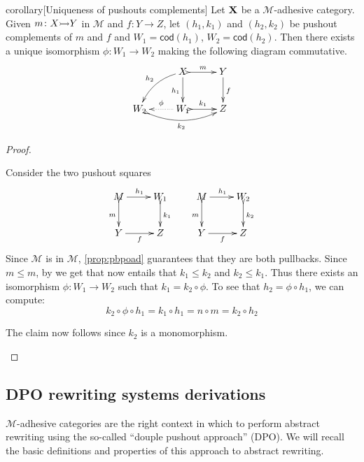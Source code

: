 \documentclass[a4paper,UKenglish,cleveref,pdftex, thm-restate,numberwithinsect]{lipics}
\newcommand{\cod}[1]{\mathsf{cod}({#1})}
\newcommand{\mto}[0]{\scalebox{1}{$\rightarrowtail$}}
\def\X{\textbf {\textup{X}}}
\def\Y{\textbf {\textup{Y}}}
\begin{document}
\begin{theoremEnd}[category=sec2]{corollary}[Uniqueness of pushouts complements]\label{lem:pocomp} 
Let $\X$ be a $\mathcal{M}$-adhesive category. Given $m\colon X\mto Y$ in $\mathcal{M}$ and $f\colon Y\to Z$, let $(h_1, k_1)$ and $(h_2, k_2)$ be pushout complements of $m$  and $f$ and $W_1=\cod{h_1}$, $W_2=\cod{h_2}$. Then there exists a unique isomorphism $\phi\colon W_1\to W_2$ making the following diagram commutative.
\[\xymatrix{&X \ar@{>->}[r]^{m} \ar[d]_{h_1} \ar@/_.3cm/[dl]_{h_2}& Y \ar[d]^{f} \\ W_2 \ar@{>->}@/_.4cm/[rr]_{k_2} &W_1 \ar@{.>}[l]_{\phi} \ar@{>->}[r]^{k_1} & Z }\]
\end{theoremEnd}
\begin{proof}\begin{proofEnd}
	Consider the two pushout squares
	\[\xymatrix{M \ar[r]^{h_1}\ar@{>->}[d]_{m}& W_1 \ar@{>->}[d]^{k_1} & M \ar@{>->}[d]_{m} \ar[r]^{h_1}& W_2 \ar@{>->}[d]^{k_2}\\Y\ar[r]_{f}&Z &Y \ar[r]_{f}&Z}\]
	Since $\mathcal{M}$ is in $\mathcal{M}$, \cref{prop:pbpoad} guarantees that they are both pullbacks.
	Since $m\leq m$, by  we get that now entails that $k_1\leq k_2$ and $k_2\leq k_1$. Thus there exists an isomorphism $\phi\colon W_1\to W_2$ such that $k_1=k_2\circ \phi$. To see that $h_2=\phi\circ h_1$, we can compute:
	\[
	k_2\circ \phi \circ h_1  = k_1\circ h_1= n\circ m= k_2\circ h_2\]
	
	The claim now follows since $k_2$ is a monomorphism.
	\end{proofEnd} 
\end{proof}
\subsection{DPO rewriting systems derivations}
$\mathcal{M}$-adhesive categories are the right context in which to perform abstract rewriting using the so-called ``douple pushout approach'' (DPO). We will recall the basic definitions and properties of this approach to abstract rewriting. 
\end{document}
